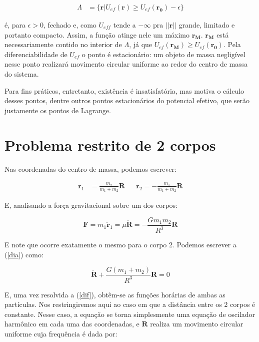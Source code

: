 \begin{align} 
    \Lambda &= \{\mathbf{r} | U_{ef}(\mathbf{r}) \geq U_{ef}(\mathbf{r_0}) - \epsilon\}
\end{align}

é, para $\epsilon > 0$, fechado e, como $U_{eff}$ tende a $-\infty$ pra $||\mathbf{r}||$ grande, limitado e portanto compacto. Assim, a função atinge nele um máximo $\mathbf{r_M}$. $\mathbf{r_M}$ está necessariamente contido no interior de $\Lambda$, já que $U_{ef}(\mathbf{r_M}) \geq U_{ef}(\mathbf{r_0})$. Pela diferenciabilidade de $U_{ef}$ o ponto é estacionário: um objeto de massa negligível nesse ponto realizará movimento circular uniforme ao redor do centro de massa do sistema.

Para fins práticos, entretanto, existência é insatisfatória, mas motiva o cálculo desses pontos, dentre outros pontos estacionários do potencial efetivo, que serão justamente os pontos de Lagrange.

\section{Problema restrito de 2 corpos}

Nas coordenadas do centro de massa, podemos escrever:

\begin{align}
    \mathbf{r}_1 &=  \frac{m_2}{m_1 + m_2}\mathbf{R} && \mathbf{r}_2 = - \frac{m_1}{m_1 + m_2}\mathbf{R}
\end{align}

E, analisando a força gravitacional sobre um dos corpos:

\begin{equation}
\mathbf{F} = m_1\mathbf{\ddot{r}}_1 = \mu\mathbf{\ddot{R}} = -\frac{Gm_1m_2}{R^3}\mathbf{R} \label{dia}
\end{equation}

E note que ocorre exatamente o mesmo para o corpo 2. Podemos escrever a (\ref{dia}) como:

\begin{equation}
\mathbf{\ddot{R}} + \frac{G(m_1+m_2)}{R^3}\mathbf{{R}} = 0 \label{dif}
\end{equation}

E, uma vez resolvida a (\ref{dif}), obtêm-se as funções horárias de ambas as partículas. Nos restringiremos aqui ao caso em que a distância entre os 2 corpos é constante. Nesse caso, a equação se torna simplesmente uma equação de oscilador harmônico em cada uma das coordenadas, e $\mathbf{R}$
realiza um movimento circular uniforme cuja frequência é dada por:

